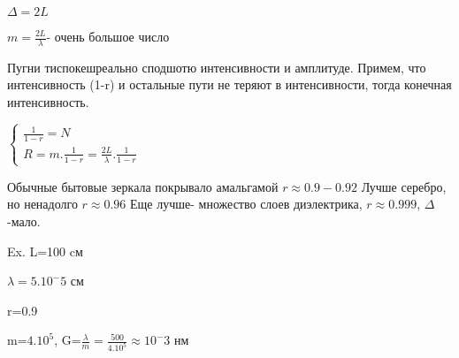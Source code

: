 \documentclass[12pt]{article}
\begin{document}
$\Delta=2L$

$m=\frac{2L}{\lambda}$- очень большое число

Пугни тиспокешреально сподшотю интенсивности и амплитуде. Примем, что интенсивность (1-r) и остальные пути не теряют в интенсивности, тогда конечная интенсивность.

$\left\{ \begin{array}{l} \frac{1}{1-r}=N \\  R=m.\frac{1}{1-r}=\frac{2L}{\lambda}.\frac{1}{1-r} \end{array} \right.$

Обычные бытовые зеркала покрывало амальгамой $r\approx 0.9-0.92$ Лучше серебро, но ненадолго $r\approx 0.96$ Еще лучше- множество слоев диэлектрика, $r\approx 0.999$, $\Delta$-мало.

Ex. L=100 cм

$\lambda=5.10^-5$ см

r=0.9

m=$4.10^5$, G=$\frac{\lambda}{m}=\frac{500}{4.10^5}\approx 10^-3$ нм
\end{document}
